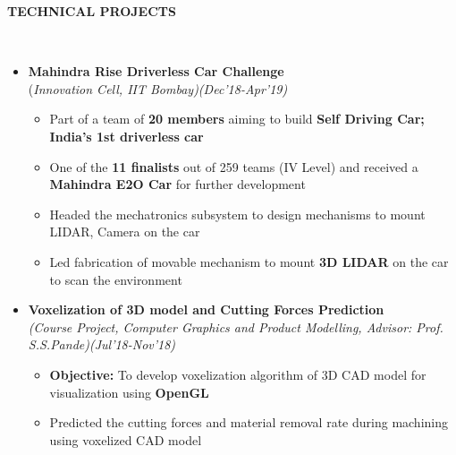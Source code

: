 \documentclass[a4paper,10pt]{article}
\newcommand{\resheading}[1]{{\small \colorbox{mygrey}{\begin{minipage}{0.99\textwidth}{\textbf{#1 \vphantom{p\^{E}}}}\end{minipage}}}}
\begin{document}
\newpage
\noindent
\resheading{\textbf{TECHNICAL PROJECTS}}\\[-0.3cm]
\begin{itemize}%

\item \textbf{Mahindra Rise Driverless Car Challenge}\\
(\emph{Innovation Cell, IIT Bombay)\hfill (Dec’18-Apr'19)} \\[-0.4cm]
	\begin{itemize}[noitemsep,nolistsep]
    \item Part of a team of \textbf{20 members} aiming to build \textbf{Self Driving Car; India’s 1st driverless car}
    \item One of the \textbf{11 finalists} out of 259 teams (IV Level) and received a \textbf{Mahindra E2O Car} for further development
     \item Headed the mechatronics subsystem to design mechanisms to mount LIDAR, Camera on the car 
    \item Led fabrication of movable mechanism to mount \textbf{3D LIDAR} on the car to scan the environment 
	\end{itemize}
	
\item \textbf{Voxelization of 3D model and Cutting Forces Prediction}\\
\emph{(Course Project, Computer Graphics and Product Modelling, Advisor: Prof. S.S.Pande)\hfill (Jul'18-Nov’18)} \\[-0.4cm]
	\begin{itemize}[noitemsep,nolistsep]
    \item \textbf{Objective:} To develop voxelization algorithm of 3D CAD model for visualization using \textbf{OpenGL}
    \item Predicted the cutting forces and material removal rate during machining using voxelized CAD model
	\end{itemize}
	

\end{itemize}
\end{document}

